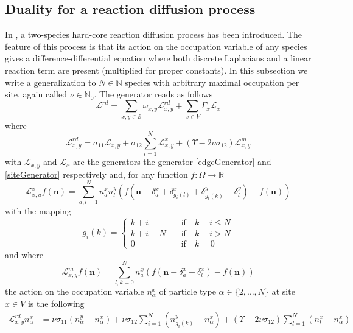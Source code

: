 \documentclass[11pt]{article}
\numberwithin{equation}{section}
\numberwithin{equation}{subsection}
\begin{document}
\subsection{Duality for a reaction diffusion process}
In \cite{casini2022uphill}, a two-species hard-core reaction diffusion process has been introduced. The feature of this process is that its action on the occupation variable of any species gives a difference-differential equation where both discrete Laplacians and a linear reaction term are present (multiplied for proper constants). In this subsection we write a generalization to $N\in \mathbb{N}$ species with arbitrary maximal occupation per site, again called $\nu\in\mathbb{N}_{0}$. The generator reads as follows
\begin{equation}\label{RDGenerator}
    \mathcal{L}^{rd}=\sum_{x,y\in\mathcal{E}}\omega_{x,y}\mathcal{L}_{x,y}^{rd}+\sum_{x\in V}\Gamma_{x}\mathcal{L}_{x}
\end{equation}
where
\begin{equation}
    \mathcal{L}_{x,y}^{rd}=\sigma_{11}\mathcal{L}_{x,y}+\sigma_{12}\sum_{i=1}^{N}\mathcal{L}_{x,y}^{x}+(\Upsilon-2\nu\sigma_{12})\mathcal{L}_{x,y}^{m}
\end{equation}
with $\mathcal{L}_{x,y}$ and $\mathcal{L}_{x}$ are the generators the generator \eqref{edgeGenerator} and \eqref{siteGenerator} respectively and, for any function $f:\Omega\to \mathbb{R}$
\begin{equation}
    \mathcal{L}_{x,u}^{x}f(\bm{n})=\sum_{a,l=1}^{N}n_{a}^{x}n_{l}^{y}\left(f(\bm{n}-\delta_{a}^{x}+\delta_{g_{i}(l)}^{x}+\delta_{g_{i}(k)}^{y}-\delta_{l}^{y})-f(\bm{n})\right)
\end{equation}
with the mapping 
\begin{equation}
    g_{i}(k)=\begin{cases}
    k+i \quad &\text{if}\quad k+i\leq N\\
    k+i-N\quad &\text{if}\quad k+i>N\\
    0\quad &\text{if}\quad k=0
\end{cases}
\end{equation}
and where
\begin{equation}
    \mathcal{L}_{x,y}^{m}f(\bm{n})=\sum_{l,k=0}^{N}n_{a}^{x}\left(f(\bm{n}-\delta_{a}^{x}+\delta_{l}^{x})-f(\bm{n})\right)
\end{equation}
the action on the occupation variable $n_{\alpha}^{x}$ of particle type $\alpha\in \{2,\ldots,N\}$ at site $x\in V $
is the following
\begin{equation}\label{actionGraphRD}
\begin{split}
    \mathcal{L}_{x,y}^{rd}n_{\alpha}^{x}&=\nu \sigma_{11}(n_{\alpha}^{y}-n_{\alpha}^{x})+\nu\sigma_{12}\sum_{i=1}^{N}(n_{g_{i}(k)}^{y}-n_{\alpha}^{x})+(\Upsilon-2\nu\sigma_{12})\sum_{l=1}^{N}(n_{l}^{x}-n_{\alpha}^{x})
\end{split}
\end{equation}
\end{document}
